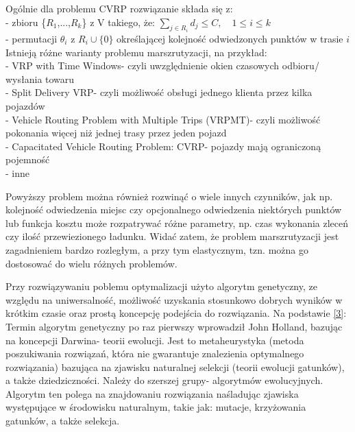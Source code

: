 \documentclass[a4paper, twoside, 12pt, justified]{article}
\begin{document}
	Ogólnie dla problemu CVRP rozwiązanie składa się z:\\
	- zbioru \{$R_{1}$,...,$R_{k}$\} z V takiego, że:  $\sum_{j \in R_i} d_j \leq C, \quad 1 \leq i \leq k$ \\
	- permutacji $\theta_i$ z $R_i \cup \{0\}$ określającej kolejność odwiedzonych punktów w trasie $i$\\
	
	Istnieją różne warianty problemu marszrutyzacji, na przykład:\\ 
	- VRP with Time Windows- czyli uwzględnienie okien czasowych odbioru/ wysłania towaru\\
	- Split Delivery VRP- czyli możliwość obsługi jednego klienta przez kilka pojazdów\\
	- Vehicle Routing Problem with Multiple Trips (VRPMT)- czyli możliwość pokonania więcej niż jednej trasy przez jeden pojazd\\
	- Capacitated Vehicle Routing Problem: CVRP- pojazdy mają ograniczoną pojemność\\ 
	- inne

	\vspace{5mm} %

	\hspace{5mm}Powyższy problem można również rozwinąć o wiele innych czynników, jak np. kolejność odwiedzenia miejsc czy opcjonalnego odwiedzenia niektórych punktów lub funkcja kosztu może rozpatrywać różne parametry, np. czas wykonania zleceń czy ilość przewiezionego ładunku. Widać zatem, że problem marszrutyzacji jest zagadnieniem bardzo rozległym, a przy tym elastycznym, tzn. można go dostosować do wielu różnych problemów.
	
	\vspace{5mm}
	
	\hspace{5mm}Przy rozwiązywaniu poblemu optymalizacji użyto algorytm genetyczny, ze względu na uniwersalność, możliwość uzyskania stosunkowo dobrych wyników w krótkim czasie oraz prostą koncepcję podejścia do rozwiązania. Na podstawie \hyperlink{ag}{[3]}:\\
	Termin algorytm genetyczny po raz pierwszy wprowadził John Holland, bazując na koncepcji Darwina- teorii ewolucji. Jest to metaheurystyka (metoda poszukiwania rozwiązań, która nie gwarantuje znalezienia optymalnego rozwiązania) bazująca na zjawisku naturalnej selekcji (teorii ewolucji gatunków), a także dziedziczności. Należy do szerszej grupy- algorytmów ewolucyjnych. Algorytm ten polega na znajdowaniu rozwiązania naśladując zjawiska występujące w środowisku naturalnym, takie jak: mutacje, krzyżowania gatunków, a także selekcja. \newpage
	
\end{document}
